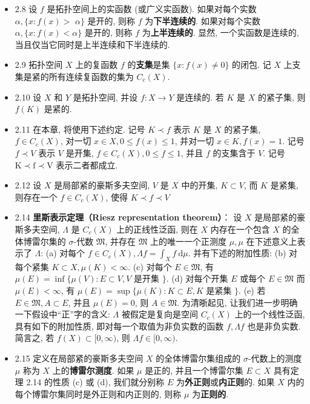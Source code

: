 \begin{itemize}
\item 2.8 设 $f$ 是拓扑空间上的实函数 (或广义实函数). 如果对每个实数 $\alpha,\{x: f(x)>$ $\alpha\}$ 是开的, 则称 $f$ 为\textbf{下半连续的}. 如果对每个实数 $\alpha,\{x: f(x)<\alpha\}$ 是开的, 则称 $f$ 为\textbf{上半连续的}. 显然, 一个实函数是连续的, 当且仅当它同时是上半连续和下半连续的.

\item 2.9 拓扑空间 $X$ 上的复函数 $f$ 的\textbf{支集}是集 $\{x: f(x) \neq 0\}$ 的闭包. 记 $X$ 上支集是紧的所有连续复函数的集为 $C_{c}(X)$.

\item 2.10 设 $X$ 和 $Y$ 是拓扑空间, 并设 $f: X \rightarrow Y$ 是连续的. 若 $K$ 是 $X$ 的紧子集, 则 $f(K)$ 是紧的.

\item 2.11 在本章, 将使用下述约定. 记号 $K \prec f$ 表示 $K$ 是 $X$ 的紧子集, $f \in C_{c}(X)$, 对一切 $x \in X, 0 \leqslant f(x) \leqslant 1$, 并对一切 $x \in K, f(x)=1$. 记号 $f \prec V$ 表示 $V$ 是开集, $f \in C_{c}(X), 0 \leqslant f \leqslant 1$, 并且 $f$ 的支集含于 $V$. 记号 $\mathrm{K}\prec\mathrm{f}\prec\mathrm{V}$ 表示二者都成立.

\item 2.12 设 $X$ 是局部紧的豪斯多夫空间, $V$ 是 $X$ 中的开集, $K \subset V$, 而 $K$ 是紧集, 则存在一个 $f \in C_{c}(X)$, 使得 $K \prec f \prec V$

\item 2.14 \textbf{里斯表示定理（Riesz representation theorem）}： 设 $X$ 是局部紧的豪斯多夫空间, $\Lambda$ 是 $C_{c}(X)$ 上的正线性泛函, 则在 $X$ 内存在一个包含 $X$ 的全体博雷尔集的 $\sigma$-代数 $\mathfrak{M}$, 并存在 $\mathfrak{M}$ 上的唯一一个正测度 $\mu, \mu$ 在下述意义上表示了 $\Lambda$: 
(a) 对每个 $f \in C_{c}(X), \Lambda f=\int_{X} f \mathrm{~d} \mu$.
并有下述的附加性质:
(b) 对每个紧集 $K \subset X, \mu(K)<\infty$.
(c) 对每个 $E \in \mathfrak{M}$, 有 $\mu(E)=\inf \{\mu(V): E \subset V, V$ 是开集 $\} .$
(d) 对每个开集 $E$ 或每个 $E \in \mathfrak{M}$ 而 $\mu(E)<\infty$, 有 $\mu(E)=\sup \{\mu(K): K \subset E, K$ 是紧集 $\} .$
(e) 若 $E \in \mathfrak{M}, A \subset E$, 并且 $\mu(E)=0$, 则 $A \in \mathfrak{M}$.
为清晣起见, 让我们进一步明确一下假设中“正”字的含义: $\Lambda$ 被假定是复向是空间 $C_{c}(X)$ 上的一个线性泛函, 具有如下的附加性质, 即对每一个取值为非负实数的函数 $f, \Lambda f$ 也是非负实数. 简言之, 若 $f(X) \subset[0, \infty)$, 则 $\Lambda f \in[0, \infty)$.

\item 2.15 定义在局部紧的豪斯多夫空间 $X$ 的全体博雷尔集组成的 $\sigma$-代数上的测度 $\mu$ 称为 $X$ 上的\textbf{博雷尔测度}. 如果 $\mu$ 是正的, 并且一个博雷尔集 $E \subset X$ 具有定理 2.14 的性质 (c) 或 (d), 我们就分别称 $E$ 为\textbf{外正则}或\textbf{内正则}的. 如果 $X$ 内的每个博雷尔集同时是外正则和内正则的, 则称 $\mu$ 为\textbf{正则的}.


\end{itemize}
